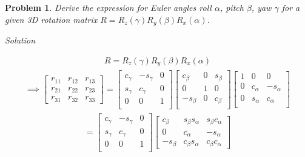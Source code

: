\documentclass{article}
\newtheorem{prob}{Problem}
\numberwithin{prob}{section}
\newenvironment{solution}{\emph{Solution}}{}
\begin{document}
\begin{prob}
  Derive the expression for Euler angles roll $\alpha$, pitch $\beta$, yaw $\gamma$ for a given 3D rotation matrix $R = R_z(\gamma) R_y(\beta) R_x(\alpha)$.
\end{prob}
\begin{solution}


\begin{align}
  R = R_z(\gamma) R_y(\beta) R_x(\alpha)
\end{align}
\begin{align}
  \implies \begin{bmatrix}
    r_{11} & r_{12} & r_{13}  \\
    r_{21} & r_{22} & r_{23}  \\
    r_{31} & r_{32} & r_{33}  
  \end{bmatrix}
  =
  \begin{bmatrix}
    c_\gamma & -s_\gamma & 0 \\
    s_\gamma & c_\gamma & 0 \\
    0 & 0 & 1\\
  \end{bmatrix}
  \begin{bmatrix}
    c_\beta & 0 & s_\beta \\
    0 & 1 & 0\\
    -s_\beta & 0 & c_\beta \\
  \end{bmatrix}
  \begin{bmatrix}
    1 & 0 & 0\\
    0 & c_\alpha & -s_\alpha \\
    0 & s_\alpha & c_\alpha \\
  \end{bmatrix}
\end{align}
\begin{align}
  = \begin{bmatrix}
    c_\gamma & -s_\gamma & 0 \\
    s_\gamma & c_\gamma & 0 \\
    0 & 0 & 1\\
  \end{bmatrix}
  \begin{bmatrix}
    c_\beta & s_\beta s_\alpha & s_\beta c_\alpha \\
    0 & c_\alpha & -s_\alpha \\
    -s_\beta & c_\beta s_\alpha & c_\beta c_\alpha
  \end{bmatrix}
\end{align}

\end{solution}
\end{document}
